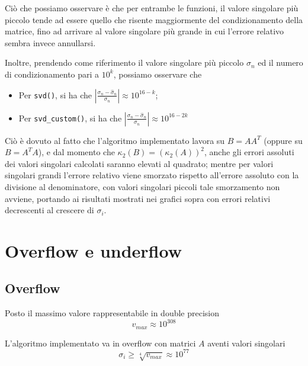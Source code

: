 Ciò che possiamo osservare è che per entrambe le funzioni, il valore singolare 
più piccolo tende ad essere quello che risente maggiormente del condizionamento 
della matrice, fino ad arrivare al valore singolare più grande in cui l'errore 
relativo sembra invece annullarsi.

Inoltre, prendendo come riferimento il valore singolare più piccolo $\sigma_n$ 
ed il numero di condizionamento pari a $10^k$, possiamo osservare che
\begin{itemize}
\item Per \texttt{svd()}, si ha che $\left| \frac{\sigma_n - 
\hat{\sigma}_n}{\sigma_n} \right| \approx 10^{16 - k}$;
\item Per \texttt{svd\_custom()}, si ha che $\left| \frac{\sigma_n - 
\hat{\sigma}_n}{\sigma_n} \right| \approx 10^{16 - 2k}$
\end{itemize}

Ciò è dovuto al fatto che l'algoritmo implementato lavora su $B = A A^T$ (oppure 
su $B = A^T A$), e dal momento che $\kappa_2(B) = (\kappa_2(A))^2$, anche gli 
errori assoluti dei valori singolari calcolati saranno elevati al quadrato; 
mentre per valori singolari grandi l'errore relativo viene smorzato rispetto 
all'errore assoluto con la divisione al denominatore, con valori singolari 
piccoli tale smorzamento non avviene, portando ai risultati mostrati nei grafici 
sopra con errori relativi decrescenti al crescere di $\sigma_i$.


\newpage
\section{Overflow e underflow}
\subsection{Overflow}
Posto il massimo valore rappresentabile in double precision
\begin{equation*}
	v_{max} \approx 10^{308}
\end{equation*}

L'algoritmo implementato va in overflow con matrici $A$ aventi valori singolari
\begin{equation*}
	\sigma_i \geq \sqrt[4]{v_{max}} \approx 10^{77}
\end{equation*}

